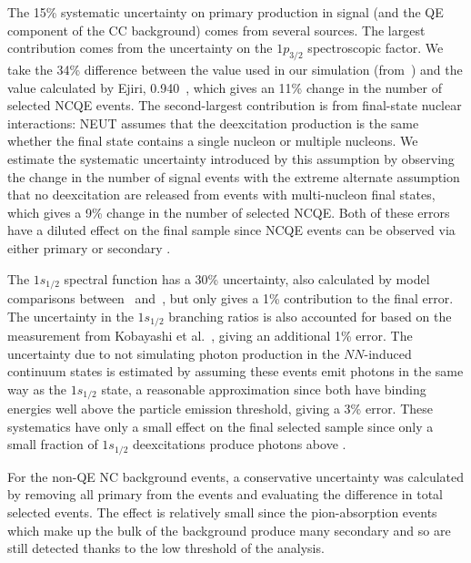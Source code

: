 \documentclass[
aps,
prd,
twocolumn,
superscriptaddress,
showpacs
]{revtex4-1}
\begin{document}
The 15\% systematic uncertainty on primary \gmr production in signal (and the QE component of the CC background) comes from several sources. The largest contribution comes from the uncertainty on the $1p_{3/2}$ spectroscopic factor.  We take the 34\% difference between the value used in our simulation (from~\cite{Ankowski:2011ei}) and the value calculated by Ejiri, 0.940~\cite{Ejiri:1993rh}, which gives an 11\% change in the number of selected NCQE events.  The second-largest contribution is from final-state nuclear interactions: NEUT assumes that the deexcitation \gmr production is the same whether the final state contains a single nucleon or multiple nucleons.  We estimate the systematic uncertainty introduced by this assumption by observing the change in the number of signal events with the extreme alternate assumption that no deexcitation \gmrs are released from events with multi-nucleon final states, which gives a 9\% change in the number of selected NCQE. 
Both of these errors have a diluted effect on the final sample since NCQE events can be observed via either primary or secondary \gmrs.

The $1s_{1/2}$ spectral function has a 30\% uncertainty, also calculated by model comparisons between~\cite{Ankowski:2011ei} and~\cite{Ejiri:1993rh}, but only gives a 1\% contribution to the final error.  The uncertainty in the $1s_{1/2}$ branching ratios is also accounted for based on the measurement from Kobayashi et al.~\cite{Kobayashi:2006gb}, giving an additional 1\% error.  The uncertainty due to not simulating photon production in the $NN$-induced continuum states is estimated by assuming these events emit photons in the same way as the $1s_{1/2}$ state, a reasonable approximation since both have binding energies well above the particle emission threshold, giving a 3\% error.  These systematics have only a small effect on the final selected sample since only a small fraction of $1s_{1/2}$ deexcitations produce photons above . 

For the non-QE NC background events, a conservative uncertainty was calculated by removing all primary \gmrs from the events and evaluating the difference in total selected events. The effect is relatively small since the pion-absorption events which make up the bulk of the \ncoth background produce many secondary \gmrs and so are still detected thanks to the low threshold of the analysis.
\end{document}
